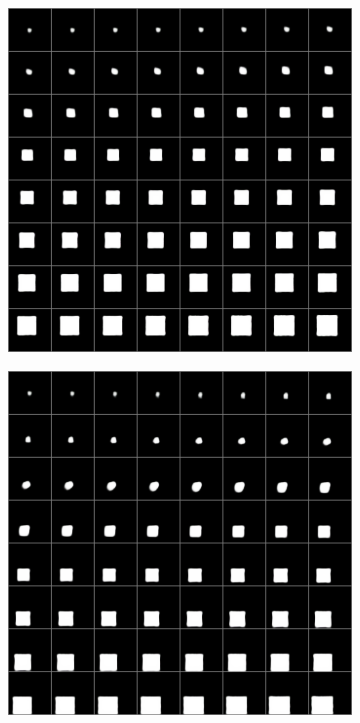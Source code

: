 \documentclass[10pt,a4paper]{article}
\begin{document}
\begin{figure}[!ht]
\begin{subfigure}{0.49\textwidth}
        \includegraphics[width=\textwidth]{square_interpolation_x.png}
        \caption{}
        \label{fig1:subim2}
    \end{subfigure}
    \begin{subfigure}{0.49\textwidth}
        \centering	
        \includegraphics[width=\textwidth ] {square_interpolation_y.png}

\end{subfigure}
\end{figure}
\end{document}
